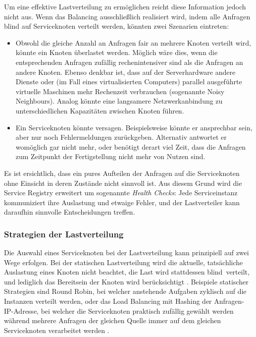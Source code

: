 Um eine effektive Lastverteilung zu ermöglichen reicht diese Information jedoch nicht aus. Wenn das Balancing ausschließlich realisiert wird, indem alle Anfragen \glq blind\grq{} auf Serviceknoten verteilt werden, könnten zwei Szenarien eintreten:
\begin{itemize}
	\item Obwohl die gleiche Anzahl an Anfragen fair an mehrere Knoten verteilt wird, könnte ein Knoten überlastet werden. Möglich wäre dies, wenn die entsprechenden Anfragen zufällig rechenintensiver sind als die Anfragen an andere Knoten. Ebenso denkbar ist, dass auf der Serverhardware andere Dienste oder (im Fall eines virtualisierten Computers) parallel ausgeführte virtuelle Maschinen mehr Rechenzeit verbrauchen (sogenannte \glqq Noisy Neighbours\grqq{}). Analog könnte eine langsamere Netzwerkanbindung zu unterschiedlichen Kapazitäten zwischen Knoten führen.
	\item Ein Serviceknoten könnte versagen. Beispielsweise könnte er ansprechbar sein, aber nur noch Fehlermeldungen zurückgeben. Alternativ antwortet er womöglich gar nicht mehr, oder benötigt derart viel Zeit, dass die Anfragen zum Zeitpunkt der Fertigstellung nicht mehr von Nutzen sind.
\end{itemize}

Es ist ersichtlich, dass ein pures Aufteilen der Anfragen auf die Serviceknoten ohne Einsicht in deren Zustände nicht sinnvoll ist. Aus diesem Grund wird die Service Registry erweitert um sogenannte \textit{Health Checks}: Jede Serviceinstanz kommuniziert ihre Auslastung und etwaige Fehler, und der Lastverteiler kann daraufhin sinnvolle Entscheidungen treffen.

\subsubsection{Strategien der Lastverteilung}
Die Auswahl eines Serviceknoten bei der Lastverteilung kann prinzipiell auf zwei Wege erfolgen. Bei der statischen Lastverteilung wird die aktuelle, tatsächliche Auslastung eines Knoten nicht beachtet, die Last wird stattdessen \glq blind\grq\ verteilt, und lediglich das Bereitsein der Knoten wird berücksichtigt \cite{mishra.2020}. Beispiele statischer Strategien sind Round Robin, bei welcher anstehende Aufgaben zyklisch auf die Instanzen verteilt werden, oder das Load Balancing mit Hashing der Anfragen-IP-Adresse, bei welcher die Serviceknoten praktisch zufällig gewählt werden während mehrere Anfragen der gleichen Quelle immer auf dem gleichen Serviceknoten verarbeitet werden \cite{g4g-loadbalancing}.

